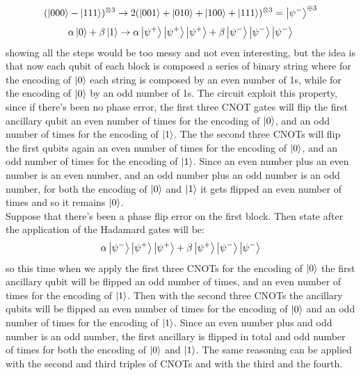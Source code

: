 \documentclass{article}
\begin{document}
	\[  (\ket{000} - \ket{111})^{\otimes 3} \rightarrow 2(\ket{001} + \ket{010} + \ket{100} + \ket{111})^{\otimes 3} = \ket{\psi^-}^{\oplus 3}\]
	\[\alpha \ket{0} + \beta\ket{1} \rightarrow \alpha\ket{\psi^+}\ket{\psi^+}\ket{\psi^+} + \beta\ket{\psi^-}\ket{\psi^-}\ket{\psi^-}\]
	showing all the steps would be too messy and not even interesting, but the idea is that now each qubit of each block is composed a series of binary string where for the encoding of $\ket{0}$ each string is composed by an even number of 1s, while for the encoding of $\ket{0}$ by an odd number of 1s. The circuit exploit this property, since if there's been no phase error, the first three CNOT gates will flip the first ancillary qubit an even number of times for the encoding of $\ket{0}$, and an odd number of times for the encoding of $\ket{1}$. The the second three CNOTs will flip the first qubits again an even number of times for the encoding of $\ket{0}$, and an odd number of times for the encoding of $\ket{1}$. Since an even number plus an even number is an even number, and an odd number plus an odd number is an odd number, for both the encoding of $\ket{0}$ and $\ket{1}$ it gets flipped an even number of times and so it remains $\ket{0}$.\\
	Suppose that there's been a phase flip error on the first block. Then state after the application of the Hadamard gates will be:
	\[ \alpha\ket{\psi^-}\ket{\psi^+}\ket{\psi^+} + \beta\ket{\psi^+}\ket{\psi^-}\ket{\psi^-}\]
	so this time when we apply the first three CNOTs for the encoding of $\ket{0}$ the first ancillary qubit will be flipped an odd number of times, and an even number of times for the encoding of $\ket{1}$. Then with the second three CNOTs the ancillary qubits will be flipped an even number of times for the encoding of $\ket{0}$ and an odd number of times for the encoding of $\ket{1}$. Since an even number plus and odd number is an odd number, the first ancillary is flipped in total and odd number of times for both the encoding of $\ket{0}$ and $\ket{1}$. The same reasoning can be applied with the second and third triples of CNOTs and with the third and the fourth.
	
\end{document}
